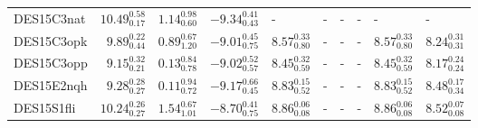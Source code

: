 \documentclass[fleqn,usenatbib,]{mnras}
\begin{document}
\begin{table}
\begin{threeparttable}
\begin{tabular}{lrrrllllll}
DES15C3nat  &  $10.49 _{\scriptscriptstyle 0.17} ^{\scriptscriptstyle 0.58}$ &   $1.14 _{\scriptscriptstyle 0.60} ^{\scriptscriptstyle 0.98}$ &   $-9.34 _{\scriptscriptstyle 0.43} ^{\scriptscriptstyle 0.41}$ &                                                             - &                                                             - &                                                             - &                                                             - &                                                             - &                                                             - \\
DES15C3opk  &   $9.89 _{\scriptscriptstyle 0.44} ^{\scriptscriptstyle 0.22}$ &   $0.89 _{\scriptscriptstyle 1.20} ^{\scriptscriptstyle 0.67}$ &   $-9.01 _{\scriptscriptstyle 0.75} ^{\scriptscriptstyle 0.45}$ &  $8.57 _{\scriptscriptstyle 0.80} ^{\scriptscriptstyle 0.33}$ &                                                             - &                                                             - &                                                             - &  $8.57 _{\scriptscriptstyle 0.80} ^{\scriptscriptstyle 0.33}$ &  $8.24 _{\scriptscriptstyle 0.31} ^{\scriptscriptstyle 0.31}$ \\
DES15C3opp  &   $9.15 _{\scriptscriptstyle 0.21} ^{\scriptscriptstyle 0.32}$ &   $0.13 _{\scriptscriptstyle 0.78} ^{\scriptscriptstyle 0.84}$ &   $-9.02 _{\scriptscriptstyle 0.57} ^{\scriptscriptstyle 0.52}$ &  $8.45 _{\scriptscriptstyle 0.59} ^{\scriptscriptstyle 0.32}$ &                                                             - &                                                             - &                                                             - &  $8.45 _{\scriptscriptstyle 0.59} ^{\scriptscriptstyle 0.32}$ &  $8.17 _{\scriptscriptstyle 0.24} ^{\scriptscriptstyle 0.24}$ \\
DES15E2nqh  &   $9.28 _{\scriptscriptstyle 0.27} ^{\scriptscriptstyle 0.28}$ &   $0.11 _{\scriptscriptstyle 0.72} ^{\scriptscriptstyle 0.94}$ &   $-9.17 _{\scriptscriptstyle 0.45} ^{\scriptscriptstyle 0.66}$ &  $8.83 _{\scriptscriptstyle 0.52} ^{\scriptscriptstyle 0.15}$ &                                                             - &                                                             - &                                                             - &  $8.83 _{\scriptscriptstyle 0.52} ^{\scriptscriptstyle 0.15}$ &  $8.48 _{\scriptscriptstyle 0.34} ^{\scriptscriptstyle 0.17}$ \\
DES15S1fli  &  $10.24 _{\scriptscriptstyle 0.27} ^{\scriptscriptstyle 0.26}$ &   $1.54 _{\scriptscriptstyle 1.01} ^{\scriptscriptstyle 0.67}$ &   $-8.70 _{\scriptscriptstyle 0.75} ^{\scriptscriptstyle 0.41}$ &  $8.86 _{\scriptscriptstyle 0.08} ^{\scriptscriptstyle 0.06}$ &                                                             - &                                                             - &                                                             - &  $8.86 _{\scriptscriptstyle 0.08} ^{\scriptscriptstyle 0.06}$ &  $8.52 _{\scriptscriptstyle 0.08} ^{\scriptscriptstyle 0.07}$ \\

\end{tabular}
\end{threeparttable}
\end{table}
\end{document}
